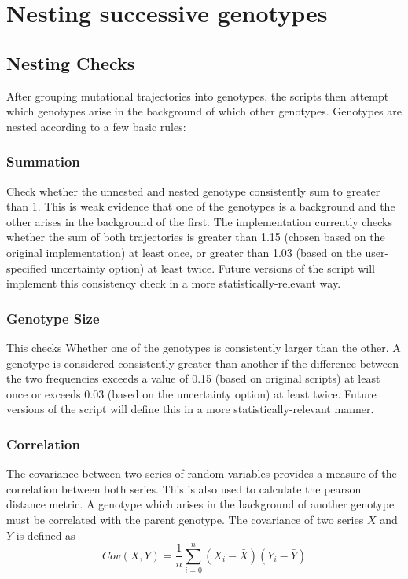 \documentclass{book}
\begin{document}
\chapter{Nesting successive genotypes}

\section{Nesting Checks}
After grouping mutational trajectories into genotypes, the scripts then attempt which genotypes arise in the background of which other genotypes.
Genotypes are nested according to a few basic rules:

\subsection{Summation}
Check whether the unnested and nested genotype consistently sum to greater than 1. This is weak evidence that one of the genotypes is a background and the other arises in the background of the first. The implementation currently checks whether the sum of both trajectories is greater than 1.15 (chosen based on the original implementation) at least once, or greater than 1.03 (based on the user-specified uncertainty option) at least twice. Future versions of the script will implement this consistency check in a more statistically-relevant way.

\subsection{Genotype Size}
This checks Whether one of the genotypes is consistently larger than the other. A genotype is considered consistently greater than another if the difference between the two frequencies exceeds a value of 0.15 (based on original scripts) at least once or exceeds 0.03 (based on the uncertainty option) at least twice. Future versions of the script will define this in a more statistically-relevant manner.

\subsection{Correlation}
The covariance between two series of random variables provides a measure of the correlation between both series. This is also used to calculate the pearson distance metric. A genotype which arises in the background of another genotype must be correlated with the parent genotype.
The covariance of two series $X$ and $Y$ is defined as
\begin{equation}
Cov(X,Y) = \frac{1}{n}\sum_{i=0}^n (X_i-\bar{X})(Y_i-\bar{Y})
\end{equation}
\end{document}
